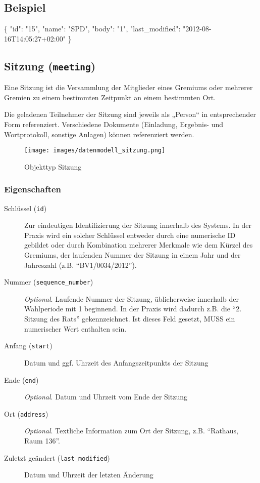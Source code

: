 \documentclass[,a4paper]{article}
\makeatletter
\newenvironment{Shaded}{}{}
\newcommand{\DataTypeTok}[1]{\textcolor[rgb]{0.56,0.13,0.00}{{#1}}}
\newcommand{\StringTok}[1]{\textcolor[rgb]{0.25,0.44,0.63}{{#1}}}
\newcommand{\NormalTok}[1]{{#1}}
\def\maxwidth{\ifdim\Gin@nat@width>\linewidth\linewidth
\else\Gin@nat@width\fi}
\let\Oldincludegraphics\includegraphics
\renewcommand{\includegraphics}[1]{\Oldincludegraphics[width=\maxwidth]{#1}}
\makeatother
\begin{document}
\subsection{Beispiel}

\begin{Shaded}
\begin{Highlighting}[]
\NormalTok{\{}
    \DataTypeTok{"id"}\NormalTok{: }\StringTok{"15"}\NormalTok{,}
    \DataTypeTok{"name"}\NormalTok{: }\StringTok{"SPD"}\NormalTok{,}
    \DataTypeTok{"body"}\NormalTok{: }\StringTok{"1"}\NormalTok{,}
    \DataTypeTok{"last_modified"}\NormalTok{: }\StringTok{"2012-08-16T14:05:27+02:00"}
\NormalTok{\}}
\end{Highlighting}
\end{Shaded}

\subsection{Sitzung (\texttt{meeting})}

Eine Sitzung ist die Versammlung der Mitglieder eines Gremiums oder
mehrerer Gremien zu einem bestimmten Zeitpunkt an einem bestimmten Ort.

Die geladenen Teilnehmer der Sitzung sind jeweils als „Person`` in
entsprechender Form referenziert. Verschiedene Dokumente (Einladung,
Ergebnis- und Wortprotokoll, sonstige Anlagen) können referenziert
werden.

\begin{figure}[htbp]
\centering
\texttt{[image: images/datenmodell\_sitzung.png]}
\caption{Objekttyp Sitzung}
\end{figure}

\subsubsection{Eigenschaften}

\begin{description}
\item[Schlüssel (\texttt{id})]
Zur eindeutigen Identifizierung der Sitzung innerhalb des Systems. In
der Praxis wird ein solcher Schlüssel entweder durch eine numerische ID
gebildet oder durch Kombination mehrerer Merkmale wie dem Kürzel des
Gremiums, der laufenden Nummer der Sitzung in einem Jahr und der
Jahreszahl (z.B. ``BV1/0034/2012'').
\item[Nummer (\texttt{sequence\_number})]
\emph{Optional}. Laufende Nummer der Sitzung, üblicherweise innerhalb
der Wahlperiode mit 1 beginnend. In der Praxis wird dadurch z.B. die
``2. Sitzung des Rats'' gekennzeichnet. Ist dieses Feld gesetzt, MUSS
ein numerischer Wert enthalten sein.
\item[Anfang (\texttt{start})]
Datum und ggf. Uhrzeit des Anfangszeitpunkts der Sitzung
\item[Ende (\texttt{end})]
\emph{Optional}. Datum und Uhrzeit vom Ende der Sitzung
\item[Ort (\texttt{address})]
\emph{Optional}. Textliche Information zum Ort der Sitzung, z.B.
``Rathaus, Raum 136''.
\item[Zuletzt geändert (\texttt{last\_modified})]
Datum und Uhrzeit der letzten Änderung
\end{description}
\end{document}
